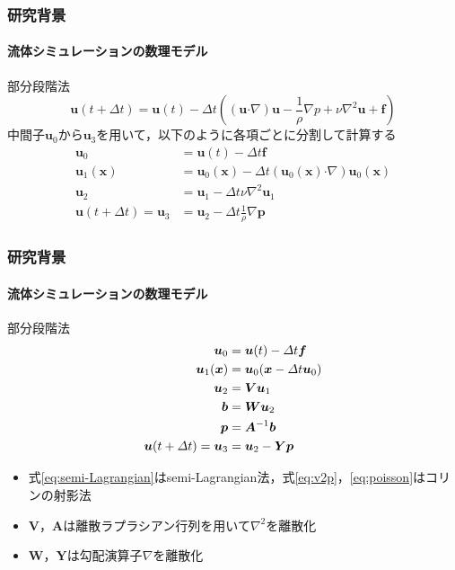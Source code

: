 \documentclass[aspectratio=169,dvipdfmx,hyperref={bookmarks=true}]{beamer}
\begin{document}
  \begin{frame}
  \frametitle{研究背景}
  \framesubtitle{流体シミュレーションの数理モデル}
    \begin{block}{部分段階法}
    	\[
	\bm{u}(t + \varDelta t)  =\bm{u}(t) -\varDelta t( (\bm{u} \boldsymbol{\cdot}\nabla) \bm{u} - \frac{1}{\rho}\nabla p + \nu\nabla^2\bm{u} + \bm{f})
	\]
中間子$\bm{u}_0$から$\bm{u}_3$を用いて，以下のように各項ごとに分割して計算する
\begin{align*}
	\bm{u}_0				& =  \bm{u} (t)  - \varDelta t \bm{f} 				\\
	\bm{u}_1 (\bm{x}) 		&= \bm{u}_0 (\bm{x}) - \varDelta t (\bm{u}_0(\bm{x})  \boldsymbol{\cdot}\nabla) \bm{u}_0(\bm{x})	\\
	\bm{u}_2  		 		&=  \bm{u}_1 - \varDelta t \nu\nabla^2\bm{u}_1		\\
	\bm{u} (t + \varDelta t) = \bm{u}_3  &=  \bm{u}_2 - \varDelta t \frac{1}{\rho}\nabla \bm{p}
	\end{align*}
\end{block}
\end{frame}
  \begin{frame}
  \frametitle{研究背景}
  \framesubtitle{流体シミュレーションの数理モデル}
    \begin{block}{部分段階法}
\begin{align}
	\bm{u}_0	& =  \bm{u} (t)  - \varDelta t \bm{f}\notag \\ 
	\bm{u}_1(\bm{x}) 	&= \bm{u}_0(\bm{x}  - \varDelta t \bm{u}_0)\label{eq:semi-Lagrangian}\\
	\bm{u}_2   		&=  \bm{V}\bm{u}_1		\notag\\
	\bm{b} 			&= \bm{W}\bm{u}_2		\label{eq:v2p}	\\ 
	\bm{p} 			&= \bm{A}^{-1}\bm{b}	\label{eq:poisson} \\ 
	\bm{u} (t + \varDelta t) = \bm{u}_3  	&=  \bm{u}_2 - \bm{Y}\bm{p}\notag
\end{align}
\begin{itemize}
\item 式\ref{eq:semi-Lagrangian}はsemi-Lagrangian法\cite{stam}，式\ref{eq:v2p}，\ref{eq:poisson}はコリンの射影法\cite{Chorin}
\item $\bm{V}$，$\bm{A}$は離散ラプラシアン行列を用いて$\nabla^2$を離散化
\item $\bm{W}$，$\bm{Y}$は勾配演算子$\nabla$を離散化
\end{itemize}
\end{block}
\end{frame}
\end{document}

